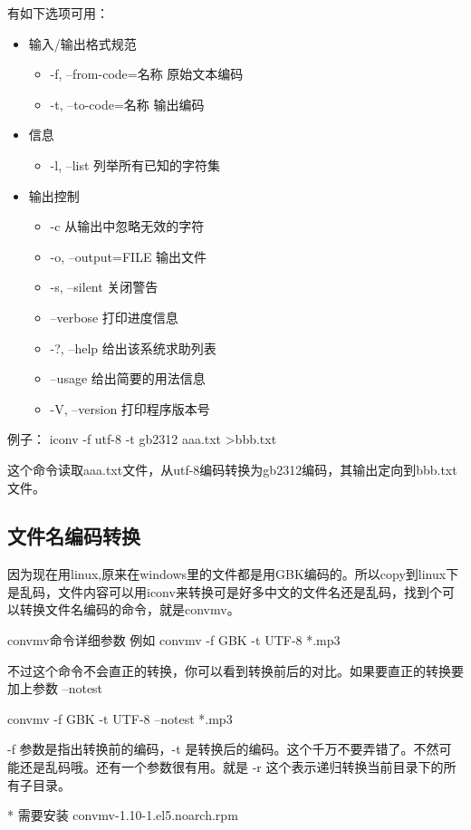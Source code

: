 {有如下选项可用：
\begin{itemize}
\item 输入/输出格式规范
	\begin{itemize}
	\item  -f, --from-code=名称 原始文本编码  
	\item -t, --to-code=名称 输出编码  
	\end{itemize}
\item 信息
	\begin{itemize}
	\item  -l, --list 列举所有已知的字符集    
	\end{itemize}
\item 输出控制
	\begin{itemize}
	\item  -c 从输出中忽略无效的字符  
	\item -o, --output=FILE 输出文件  
	\item -s, --silent 关闭警告  
	\item --verbose 打印进度信息  
	\item -?, --help 给出该系统求助列表  
	\item --usage 给出简要的用法信息  
	\item -V, --version 打印程序版本号   
	\end{itemize}
\end{itemize}  

例子： iconv -f utf-8 -t gb2312 aaa.txt >bbb.txt 

 这个命令读取aaa.txt文件，从utf-8编码转换为gb2312编码，其输出定向到bbb.txt文件。

 
\subsection{文件名编码转换}
因为现在用linux,原来在windows里的文件都是用GBK编码的。所以copy到linux下是乱码，文件内容可以用iconv来转换可是好多中文的文件名还是乱码，找到个可以转换文件名编码的命令，就是convmv。

convmv命令详细参数 
 例如
convmv -f GBK -t UTF-8 *.mp3

不过这个命令不会直正的转换，你可以看到转换前后的对比。如果要直正的转换要加上参数 --notest

convmv -f GBK -t UTF-8 --notest *.mp3

-f 参数是指出转换前的编码，-t 是转换后的编码。这个千万不要弄错了。不然可能还是乱码哦。还有一个参数很有用。就是 -r 这个表示递归转换当前目录下的所有子目录。

* 需要安装 convmv-1.10-1.el5.noarch.rpm  

}
